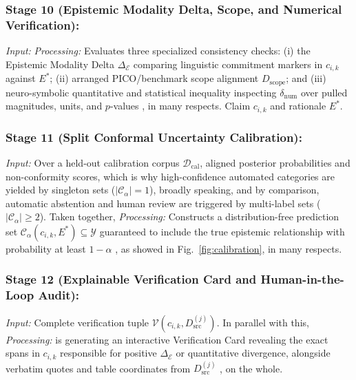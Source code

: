 \documentclass[journal]{IEEEtran}
\begin{document}
\subsubsection{Stage 10 (Epistemic Modality Delta, Scope, and Numerical Verification):}
\emph{Input:} \emph{Processing:} Evaluates three specialized consistency checks: (i) the Epistemic Modality Delta $\Delta_{\mathcal{E}}$ comparing linguistic commitment markers \cite{hyland1998hedging} in $c_{i,k}$ against $E^*$; (ii) arranged PICO/benchmark scope alignment $D_{\text{scope}}$; and (iii) neuro-symbolic quantitative and statistical inequality inspecting $\delta_{\text{num}}$ over pulled magnitudes, units, and $p$-values \cite{lu2023scitab,akhtar2023reading}, in many respects. Claim $c_{i,k}$ and rationale $E^*$.

\subsubsection{Stage 11 (Split Conformal Uncertainty Calibration):}
\emph{Input:} Over a held-out calibration corpus $\mathcal{D}_{\text{cal}}$, aligned posterior probabilities and non-conformity scores, which is why high-confidence automated categories are yielded by singleton sets ($|\mathcal{C}_{\alpha}| = 1$), broadly speaking, and by comparison, automatic abstention and human review are triggered by multi-label sets ($|\mathcal{C}_{\alpha}| \geq 2$). Taken together, \emph{Processing:} Constructs a distribution-free prediction set $\mathcal{C}_{\alpha}(c_{i,k}, E^*) \subseteq \mathcal{Y}$ guaranteed to include the true epistemic relationship with probability at least $1-\alpha$ \cite{sadinle2019least,angelopoulos2023conformal}, as showed in Fig.~\ref{fig:calibration}, in many respects.

\subsubsection{Stage 12 (Explainable Verification Card and Human-in-the-Loop Audit):}
\emph{Input:} Complete verification tuple $\mathcal{V}(c_{i,k}, D_{\text{src}}^{(j)})$. In parallel with this, \emph{Processing:} is generating an interactive Verification Card revealing the exact spans in $c_{i,k}$ responsible for positive $\Delta_{\mathcal{E}}$ or quantitative divergence, alongside verbatim quotes and table coordinates from $D_{\text{src}}^{(j)}$ \cite{rashkin2023measuring,gao2023enabling}, on the whole.
\end{document}

